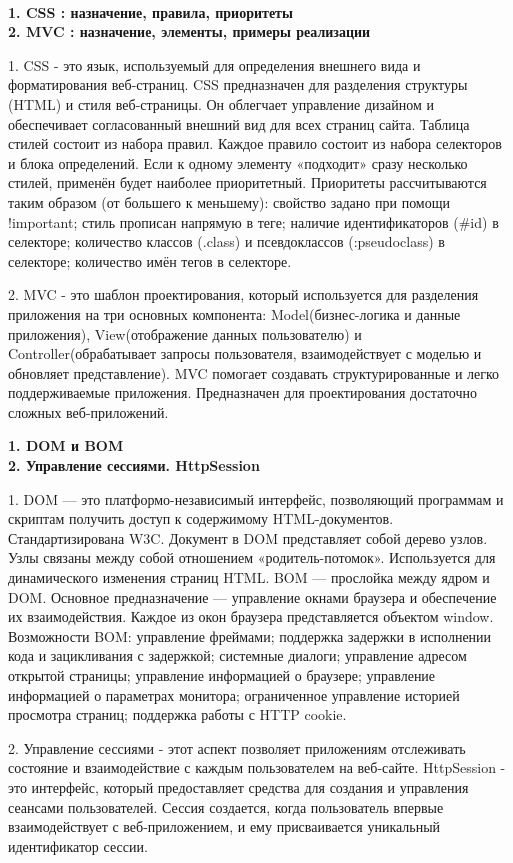 \documentclass{article}
\begin{document}
\\
\begin{minipage}{.3\textwidth}
    \textbf{1. CSS : назначение, правила, приоритеты}\\
    \textbf{2. MVC : назначение, элементы, примеры реализации}

1. CSS - это язык, используемый для определения внешнего вида и форматирования веб-страниц. CSS предназначен для разделения структуры (HTML) и стиля веб-страницы. Он облегчает управление дизайном и обеспечивает согласованный внешний вид для всех страниц сайта. Таблица стилей состоит из набора правил.
Каждое правило состоит из набора селекторов и
блока определений. Если к одному элементу «подходит» сразу несколько стилей, применён будет наиболее приоритетный.
Приоритеты рассчитываются таким образом (от большего к меньшему):
свойство задано при помощи !important;
стиль прописан напрямую в теге;
наличие идентификаторов (\#id) в селекторе; количество классов (.class) и псевдоклассов (:pseudoclass) в селекторе;
количество имён тегов в селекторе.

2. MVC - это шаблон проектирования, который используется для разделения приложения на три основных компонента: Model(бизнес-логика и данные приложения), View(отображение данных пользователю) и Controller(обрабатывает запросы пользователя, взаимодействует с моделью и обновляет представление). MVC помогает создавать структурированные и легко поддерживаемые приложения. 
Предназначен для проектирования достаточно сложных веб-приложений.
\end{minipage}
\hfill
\begin{minipage}{.3\textwidth}
    \textbf{1. DOM и BOM}\\
    \textbf{2. Управление сессиями. HttpSession}

1. DOM — это платформо-независимый интерфейс, позволяющий программам и скриптам получить доступ к содержимому HTML-документов. Стандартизирована W3C. Документ в DOM представляет собой дерево
узлов. Узлы связаны между собой отношением «родитель-потомок». Используется для динамического изменения страниц HTML. BOM — прослойка между ядром и DOM.
Основное предназначение — управление окнами браузера и обеспечение их взаимодействия. Каждое из окон браузера представляется
объектом window. Возможности BOM:
управление фреймами;
поддержка задержки в исполнении кода и зацикливания с задержкой;
системные диалоги;
управление адресом открытой страницы;
управление информацией о браузере;
управление информацией о параметрах монитора;
ограниченное управление историей просмотра страниц;
поддержка работы с HTTP cookie.

2. Управление сессиями - этот аспект позволяет приложениям отслеживать состояние и взаимодействие с каждым пользователем на веб-сайте.
HttpSession - это интерфейс, который предоставляет средства для создания и управления сеансами пользователей. Сессия создается, когда пользователь впервые взаимодействует с веб-приложением, и ему присваивается уникальный идентификатор сессии.
\end{minipage}
\end{document}
